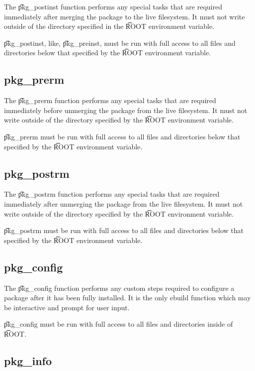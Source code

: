 The \t{pkg\_postinst} function performs any special tasks that are required immediately after
merging the package to the live filesystem. It must not write outside of the directory specified
in the \t{ROOT} environment variable.

\t{pkg\_postinst}, like, \t{pkg\_preinst}, must be run with full access to all files and directories
below that specified by the \t{ROOT} environment variable.

\subsection{pkg\_prerm}
\label{pkg-prerm-function}

The \t{pkg\_prerm} function performs any special tasks that are required immediately before
unmerging the package from the live filesystem. It must not write outside of the directory specified
by the \t{ROOT} environment variable.

\t{pkg\_prerm} must be run with full access to all files and directories below that specified by
the \t{ROOT} environment variable.

\subsection{pkg\_postrm}
\label{pkg-postrm-function}

The \t{pkg\_postrm} function performs any special tasks that are required immediately after
unmerging the package from the live filesystem. It must not write outside of the directory specified
by the \t{ROOT} environment variable.

\t{pkg\_postrm} must be run with full access to all files and directories below that specified by
the \t{ROOT} environment variable.

\subsection{pkg\_config}
\label{pkg-config-function}

The \t{pkg\_config} function performs any custom steps required to configure a package after it has been
fully installed. It is the only ebuild function which may be interactive and prompt for user input.

\t{pkg\_config} must be run with full access to all files and directories inside of \t{ROOT}.

\subsection{pkg\_info}
\label{pkg-info-function}

